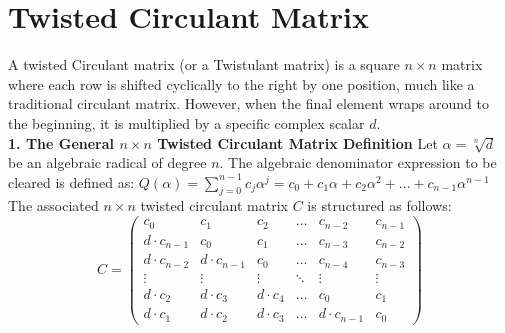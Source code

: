 
\section{Twisted Circulant Matrix}

A twisted Circulant matrix (or a Twistulant matrix) is a square $n \times n$ matrix where each row is shifted cyclically to the right by one position, much like a traditional circulant matrix. 
However, when the final element wraps around to the beginning, it is multiplied by a specific complex scalar $d$. \\


{\bf 1. The General \(n \times n\) Twisted Circulant Matrix Definition}
Let \(\alpha = \sqrt[n]{d}\) be an algebraic radical of degree \(n\). 
The algebraic denominator expression to be cleared is defined as:
\(Q(\alpha )=\sum _{j=0}^{n-1}c_{j}\alpha ^{j}=c_{0}+c_{1}\alpha +c_{2}\alpha ^{2}+\dots +c_{n-1}\alpha ^{n-1}\)
The associated \(n \times n\) twisted circulant matrix \(C\) is structured as follows:
\[C=\left(\begin{matrix}c_{0}&c_{1}&c_{2}&\dots &c_{n-2}&c_{n-1}\\ 
d\cdot c_{n-1}&c_{0}&c_{1}&\dots &c_{n-3}&c_{n-2}                     \\ 
d\cdot c_{n-2}&d\cdot c_{n-1}&c_{0}&\dots &c_{n-4}&c_{n-3}      \\ 
\vdots &\vdots &\vdots &\ddots &\vdots &\vdots                           \\ d\cdot c_{2}&d\cdot c_{3}&d\cdot c_{4}&\dots &c_{0}&c_{1}\\
 d\cdot c_{1}&d\cdot c_{2}&d\cdot c_{3}&\dots &d\cdot c_{n-1}&c_{0}
 \end{matrix}\right)\] 


